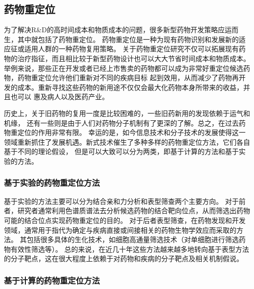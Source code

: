 \subsection{药物重定位}
\par 为了解决R\&D的高时间成本和物质成本的问题，很多新型药物开发策略应运而生，其中就包括了药物重定位。
药物重定位是一种为现有药物识别和发展新的适应征或适用人群的一种药物复用策略\cite{ashburnDrugRepositioningIdentifying2004}。
关于药物重定位研究不仅可以拓展现有药物的治疗指征，而且相比较于新型药物设计也可以大大节省时间成本和物质成本。
举例来说，那些正在开发或者已经上市售卖的药物都可以成为非常好重定位候选药物，药物重定位允许他们重新对不同的疾病目标
起到效用，从而减少了药物再开发的成本。重新寻找这些药物的新用途不仅仅会最大化药物本身所带来的收益，并且也可以
惠及病人以及医药产业。

\par 历史上，关于旧药物的复用一度是比较困难的，一些旧药新用的发现依赖于运气和机缘\cite{bolgarDrugRepositioningTreatment2013}，
还有一些则是由于人们对药物分子机制有了更深的了解\cite{richShorttermSafetyEfficacy2006}。总之，在过去药物重定位的作用非常有限。
幸运的是，如今信息技术和分子技术的发展使得这一领域重新抓住了发展机遇。新式技术催生了多种多样的药物重定位方法，它们各自基于不同的理论假设，
但是可以大致可以分为两类，即基于计算的方法和基于实验的方法。

\subsubsection{基于实验的药物重定位方法}
基于实验的方法主要可以分为结合亲和力分析和表型筛查两个主要方向\cite{dhirDrugRepurposingOrphan2020}。
对于前者，研究者通常利用色谱质谱法去分析候选药物的结合靶向位点，从而筛选出药物可能的结合位点实现药物重定位的目的。
对于后者表型筛查，在药物发现和开发领域，通常用于指代为确定与疾病直接或间接相关的药物生物学效应而采取的方法\cite{dhirDrugRepurposingOrphan2020}。
其包括很多具体的生化技术，如细胞高通量筛选技术（对单细胞进行筛选药物有效性筛选等）\cite{iljinHighThroughputCellBasedScreening2009, aulnerNextgenerationPhenotypicScreening2019}。
总的来说，在近几十年这些方法越来越多地转向基于表型方法的分子靶点，这在很大程度上依赖于对药物和疾病的分子靶点及相关机制假说\cite{dhirDrugRepurposingOrphan2020}。


\subsubsection{基于计算的药物重定位方法}


